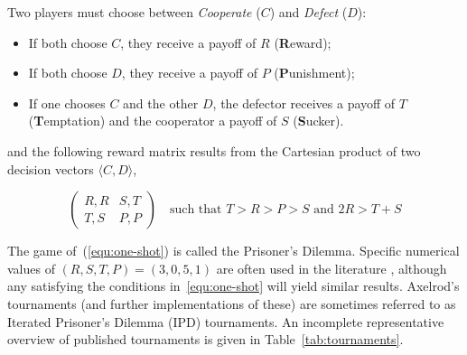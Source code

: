 \documentclass{jors}
\begin{document}
Two players must choose between \textit{Cooperate} (\(C\)) and \textit{Defect}
(\(D\)):

\begin{itemize}[noitemsep,topsep=0pt]
    \item If both choose \(C\), they receive a payoff of \(R\)
        (\textbf{R}eward);
    \item If both choose \(D\), they receive a payoff of \(P\)
        (\textbf{P}unishment);
    \item If one chooses \(C\) and the other \(D\), the defector receives a
        payoff of \(T\) (\textbf{T}emptation) and the cooperator a payoff of
        \(S\) (\textbf{S}ucker).
\end{itemize}

and the following reward matrix results from the Cartesian product of
two decision vectors $\langle C, D \rangle$,

\begin{equation}
    \begin{pmatrix}
        R,R & S,T\\
        T,S & P,P
    \end{pmatrix}\quad\text{such that } T>R>P>S \text{ and } 2R > T + S
    \label{equ:one-shot}
\end{equation}

The game of~(\ref{equ:one-shot}) is called the Prisoner's Dilemma. Specific
numerical values of \((R,S,T,P)=(3,0,5,1)\) are often used in the literature
\cite{Axelrod1980a, Axelrod1980b}, although any satisfying the conditions
in~\ref{equ:one-shot} will yield similar results. Axelrod's tournaments (and
further implementations of these) are sometimes referred to as Iterated
Prisoner's Dilemma (IPD) tournaments. An incomplete representative overview of
published tournaments is given in Table~\ref{tab:tournaments}.
\end{document}
